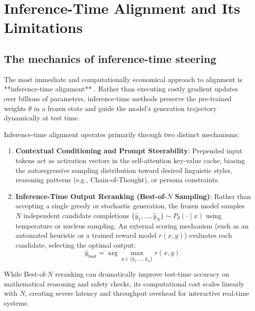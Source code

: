 \documentclass[../../../main.tex]{subfiles}
\begin{document}
\section{Inference-Time Alignment and Its Limitations}
\label{sec:inference_time_alignment_limits}

\subsection{The mechanics of inference-time steering}
\label{subsec:mechanics_inference_alignment}

The most immediate and computationally economical approach to alignment is **inference-time alignment** \citep{xiao2025}. Rather than executing costly gradient updates over billions of parameters, inference-time methods preserve the pre-trained weights $\theta$ in a frozen state and guide the model's generation trajectory dynamically at test time.

Inference-time alignment operates primarily through two distinct mechanisms:
\begin{enumerate}
    \item \textbf{Contextual Conditioning and Prompt Steerability}: Prepended input tokens act as activation vectors in the self-attention key-value cache, biasing the autoregressive sampling distribution toward desired linguistic styles, reasoning patterns (e.g., Chain-of-Thought), or persona constraints.
    \item \textbf{Inference-Time Output Reranking (Best-of-$N$ Sampling)}: Rather than accepting a single greedy or stochastic generation, the frozen model samples $N$ independent candidate completions $\{\hat{y}_1, \dots, \hat{y}_N\} \sim P_\theta(\cdot \mid x)$ using temperature or nucleus sampling. An external scoring mechanism (such as an automated heuristic or a trained reward model $r(x, y)$) evaluates each candidate, selecting the optimal output:
    \begin{equation}
    \hat{y}_{\text{best}} = \arg\max_{y \in \{\hat{y}_1, \dots, \hat{y}_N\}} r(x, y).
    \end{equation}
\end{enumerate}
While Best-of-$N$ reranking can dramatically improve test-time accuracy on mathematical reasoning and safety checks, its computational cost scales linearly with $N$, creating severe latency and throughput overhead for interactive real-time systems.
\end{document}
